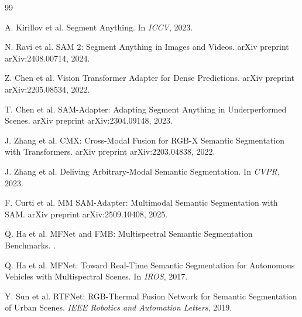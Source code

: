 \documentclass[UTF8,10pt,twocolumn]{ctexart}
\begin{document}
\begin{thebibliography}{99}

A. Kirillov et al.
\newblock Segment Anything.
\newblock In \emph{ICCV}, 2023.

N. Ravi et al.
\newblock SAM 2: Segment Anything in Images and Videos.
\newblock arXiv preprint arXiv:2408.00714, 2024.

Z. Chen et al.
\newblock Vision Transformer Adapter for Dense Predictions.
\newblock arXiv preprint arXiv:2205.08534, 2022.

T. Chen et al.
\newblock SAM-Adapter: Adapting Segment Anything in Underperformed Scenes.
\newblock arXiv preprint arXiv:2304.09148, 2023.

J. Zhang et al.
\newblock CMX: Cross-Modal Fusion for RGB-X Semantic Segmentation with Transformers.
\newblock arXiv preprint arXiv:2203.04838, 2022.

J. Zhang et al.
\newblock Deliving Arbitrary-Modal Semantic Segmentation.
\newblock In \emph{CVPR}, 2023.

F. Curti et al.
\newblock MM SAM-Adapter: Multimodal Semantic Segmentation with SAM.
\newblock arXiv preprint arXiv:2509.10408, 2025.

Q. Ha et al.
\newblock MFNet and FMB: Multispectral Semantic Segmentation Benchmarks.
.

Q. Ha et al.
\newblock MFNet: Toward Real-Time Semantic Segmentation for Autonomous Vehicles with Multispectral Scenes.
\newblock In \emph{IROS}, 2017.

Y. Sun et al.
\newblock RTFNet: RGB-Thermal Fusion Network for Semantic Segmentation of Urban Scenes.
\newblock \emph{IEEE Robotics and Automation Letters}, 2019.

\end{thebibliography}
\end{document}
